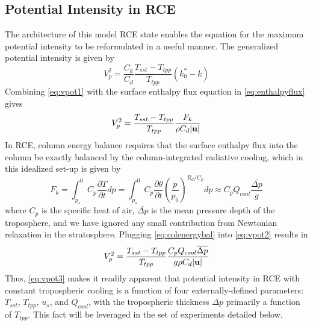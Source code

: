 \documentclass[12pt]{article}
\begin{document}
\subsection{Potential Intensity in RCE}
The architecture of this model RCE state enables the equation for the maximum potential intensity to be reformulated in a useful manner. The generalized potential intensity \citep{Emanuel_2010} is given by
\begin{equation}
\label{eq:vpot1}
V^2_p = \frac{C_k}{C_d}\frac{T_{sst} - T_{tpp}}{T_{tpp}}(k^*_0-k)
\end{equation}
Combining \eqref{eq:vpot1} with the surface enthalpy flux equation in \eqref{eq:enthalpyflux} gives
\begin{equation}
\label{eq:vpot2}
V^2_p = \frac{T_{sst} - T_{tpp}}{T_{tpp}}\frac{F_k}{\rho C_d |{\bf u}|}
\end{equation}
In RCE, column energy balance requires that the surface enthalpy flux into the column be exactly balanced by the column-integrated radiative cooling, which in this idealized set-up is given by
\begin{equation}
\label{eq:colenergybal}
F_k = \int^0_{p_s}{C_p\frac{\partial T}{\partial t}}dp = \int^0_{p_s}{C_p\frac{\partial \theta}{\partial t}\left(\frac{p}{p_0}\right)^{R_d/C_p}}dp\approx C_p Q_{cool} \frac{\overline{\Delta p}}{g}
\end{equation}
where $C_p$ is the specific heat of air, $\overline{\Delta p}$ is the mean pressure depth of the troposphere, and we have ignored any small contribution from Newtonian relaxation in the stratosphere.  Plugging \eqref{eq:colenergybal} into \eqref{eq:vpot2} results in
\begin{equation}
\label{eq:vpot3}
V^2_p = \frac{T_{sst} - T_{tpp}}{T_{tpp}}\frac{C_p Q_{cool} \overline{ \Delta p}}{g \rho C_d |{\bf u}|}
\end{equation}
Thus, \eqref{eq:vpot3} makes it readily apparent that potential intensity in RCE with constant tropospheric cooling is a function of four externally-defined parameters: $T_{sst}$, $T_{tpp}$, $u_s$, and $Q_{cool}$, with the tropospheric thickness $\Delta p$ primarily a function of $T_{tpp}$. This fact will be leveraged in the set of experiments detailed below.
\end{document}
